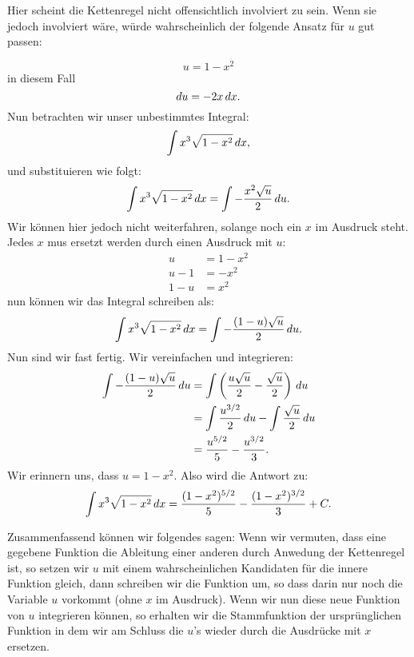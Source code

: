 \begin{solution} 
Hier scheint die Kettenregel nicht offensichtlich involviert zu sein. Wenn sie jedoch involviert wäre, würde wahrscheinlich der folgende Ansatz für $u$ gut passen:

\[
u = 1-x^2
\]
in diesem Fall
\[
du = -2x \, d x.
\]
Nun betrachten wir unser unbestimmtes Integral:
\[
\int x^3\sqrt{1-x^2}\, d x,
\]
und substituieren wie folgt:
\[
\int x^3\sqrt{1-x^2}\, d x = \int -\frac{x^2\sqrt{u}}{2}\, d u.
\]
Wir können hier jedoch nicht weiterfahren, solange noch ein $x$ im Ausdruck steht. Jedes $x$ mus ersetzt werden durch einen Ausdruck mit $u$:
\begin{align*}
u &= 1-x^2 \\
u -1 &= -x^2\\
1- u &= x^2
\end{align*}
nun können wir das Integral schreiben als:
\[
\int x^3\sqrt{1-x^2}\, d x = \int -\frac{(1-u)\sqrt{u}}{2}\, d u.
\]
Nun sind wir fast fertig. Wir vereinfachen und integrieren:
\begin{align*}
\int -\frac{(1-u)\sqrt{u}}{2}\, d u &= \int \left(\frac{u\sqrt{u}}{2} - \frac{\sqrt{u}}{2}\right) \, d u \\
&= \int \frac{u^{3/2}}{2} \, d u - \int \frac{\sqrt{u}}{2} \, d u \\
&= \frac{u^{5/2}}{5} - \frac{u^{3/2}}{3}.
\end{align*}
Wir erinnern uns, dass $u = 1-x^2$. Also wird die Antwort zu:
\[
\int x^3\sqrt{1-x^2}\, d x = \frac{(1-x^2)^{5/2}}{5} - \frac{(1-x^2)^{3/2}}{3}+C.
\]
\end{solution}

Zusammenfassend können wir folgendes sagen: Wenn wir vermuten, dass eine gegebene Funktion die Ableitung einer anderen durch Anwedung der Kettenregel ist, so setzen wir $u$ mit einem wahrscheinlichen Kandidaten für die innere Funktion gleich, dann schreiben wir die Funktion um, so dass darin nur noch die Variable $u$ vorkommt (ohne $x$ im Ausdruck). Wenn wir nun diese neue Funktion von $u$ integrieren können, so erhalten wir die Stammfunktion der ursprünglichen Funktion in dem wir am Schluss die $u$'s wieder durch die Ausdrücke mit $x$ ersetzen.


